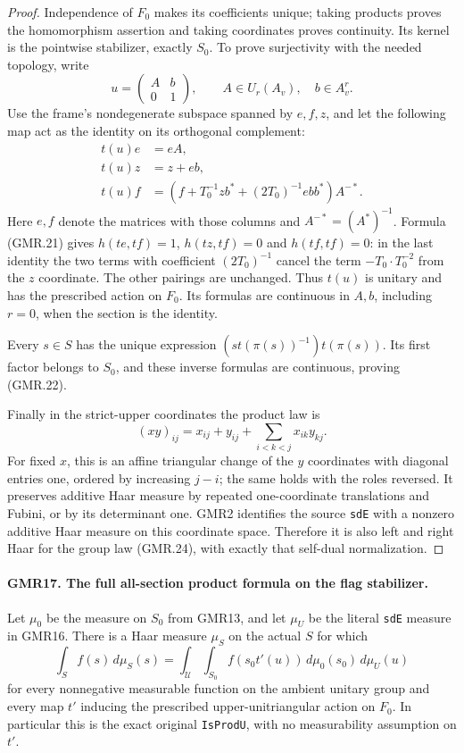 \begin{proof}
Independence of $F_0$ makes its coefficients unique; taking products
proves the homomorphism assertion and taking coordinates proves
continuity.  Its kernel is the pointwise stabilizer, exactly $S_0$.
To prove surjectivity with the needed topology, write
\[
 u=\begin{pmatrix}A&b\\0&1\end{pmatrix},
 \qquad A\in U_r(A_v),\quad b\in A_v^r.
\]
Use the frame's nondegenerate subspace spanned by $e,f,z$, and let the
following map act as the identity on its orthogonal complement:
\[
\begin{split}
 t(u)e&=eA,\\
 t(u)z&=z+eb,\\
 t(u)f&=\left(f+T_0^{-1}z b^*
                  +(2T_0)^{-1}e b b^*\right)A^{-*}.
\end{split}
 \tag{GMR.23}
\]
Here $e,f$ denote the matrices with those columns and
$A^{-*}=(A^*)^{-1}$.  Formula (GMR.21) gives
$h(t e,t f)=1$, $h(tz,t f)=0$ and $h(t f,t f)=0$:
in the last identity the two terms with coefficient $(2T_0)^{-1}$
cancel the term $-T_0\cdot T_0^{-2}$ from the $z$ coordinate.
The other pairings are unchanged.  Thus $t(u)$ is unitary and has
the prescribed action on $F_0$.  Its formulas are continuous in
$A,b$, including $r=0$, when the section is the identity.

Every $s\in S$ has the unique expression
$(s t(\pi(s))^{-1})t(\pi(s))$.  Its first factor belongs to $S_0$,
and these inverse formulas are continuous, proving (GMR.22).

Finally in the strict-upper coordinates the product law is
\[
 (xy)_{ij}=x_{ij}+y_{ij}+\sum_{i<k<j}x_{ik}y_{kj}.
 \tag{GMR.24}
\]
For fixed $x$, this is an affine triangular change of the $y$
coordinates with diagonal entries one, ordered by increasing
$j-i$; the same holds with the roles reversed.  It preserves
additive Haar measure by repeated one-coordinate translations and
Fubini, or by its determinant one.  GMR2 identifies the source
\texttt{sdE} with a nonzero additive Haar measure on this coordinate
space.  Therefore it is also left and right Haar for the group law
(GMR.24), with exactly that self-dual normalization.
\end{proof}

\paragraph{GMR17. The full all-section product formula on the flag stabilizer.}
\label{claim:GMR17}
Let $\mu_0$ be the measure on $S_0$ from GMR13, and let $\mu_U$ be
the literal \texttt{sdE} measure in GMR16.  There is a Haar measure
$\mu_S$ on the actual $S$ for which
\[
 \int_S f(s)\,d\mu_S(s)
 =\int_{\mathcal U}\int_{S_0}f(s_0t'(u))\,d\mu_0(s_0)\,d\mu_U(u)
 \tag{GMR.25}
\]
for every nonnegative measurable function on the ambient unitary
group and every map $t'$ inducing the prescribed upper-unitriangular
action on $F_0$.  In particular this is the exact original
\texttt{IsProdU}, with no measurability assumption on $t'$.

